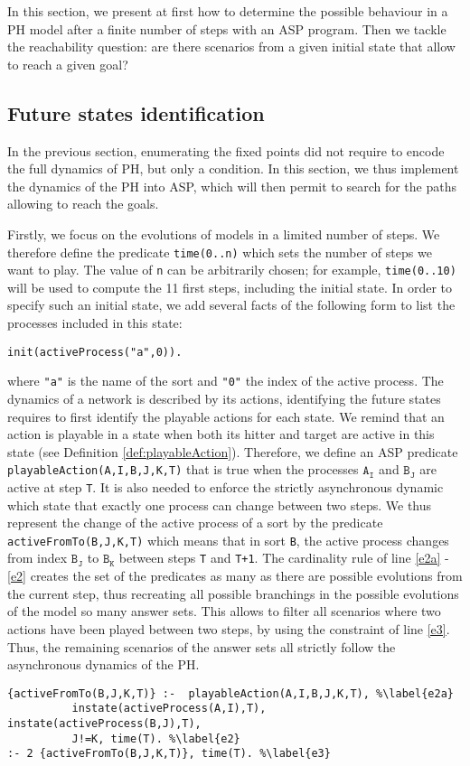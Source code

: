 
In this section, we present at first how to determine the possible behaviour in a PH model after a finite number of steps with an ASP program.
Then we tackle the reachability question: are there scenarios from a given initial state
that allow to reach a given goal?

\subsection{Future states identification}
In the previous section, enumerating the fixed points did not require to
encode the full dynamics of PH, but only a condition.
In this section, we thus implement the dynamics of the PH into ASP,
which will then permit to search for the paths allowing to reach the goals.

Firstly, we focus on the evolutions of models in a limited number of steps.
We therefore define the predicate \texttt{time(0..n)} which sets the number of steps we want to play.
The value of \texttt{n} can be arbitrarily chosen;
for example, \texttt{time(0..10)} will be used to compute the 11 first steps,
including the initial state.
In order to specify such an initial state, we add several facts of the following form
to list the processes included in this state:
\begin{lstlisting}
init(activeProcess("a",0)).
\end{lstlisting}
where \texttt{"a"} is the name of the sort and \texttt{"0"} the index of the active process.
The dynamics of a network is described by its actions,
identifying the future states requires to first identify the playable actions for each state.
We remind that an action is playable in a state when both its hitter and target are active in this state (see Definition \ref{def:playableAction}).
Therefore, we define an ASP predicate \texttt{playableAction(A,I,B,J,K,T)} that is true
when the processes $\texttt{A}_\texttt{I}$ and $\texttt{B}_\texttt{J}$ are active at step \texttt{T}.
It is also needed to enforce the strictly asynchronous dynamic
which state that exactly one process can change between two steps.
We thus represent the change of the active process of a sort
by the predicate \texttt{activeFromTo(B,J,K,T)}
which means that in sort \texttt{B}, the active process changes from index $\texttt{B}_\texttt{J}$ to $\texttt{B}_\texttt{K}$ between steps \texttt{T} and \texttt{T+1}.
The cardinality rule of line \ref{e2a} - \ref{e2}
creates the set of the predicates as many as there are possible evolutions from the current step,
thus recreating all possible branchings in the possible evolutions of the model so many answer sets.
This allows to filter all scenarios where two actions have been played between
two steps, by using the constraint of line \ref{e3}.
Thus, the remaining scenarios of the answer sets all strictly follow
the asynchronous dynamics of the PH.
\begin{lstlisting}
{activeFromTo(B,J,K,T)} :-  playableAction(A,I,B,J,K,T), %\label{e2a}
          instate(activeProcess(A,I),T), instate(activeProcess(B,J),T),
          J!=K, time(T). %\label{e2}
:- 2 {activeFromTo(B,J,K,T)}, time(T). %\label{e3}
\end{lstlisting}

